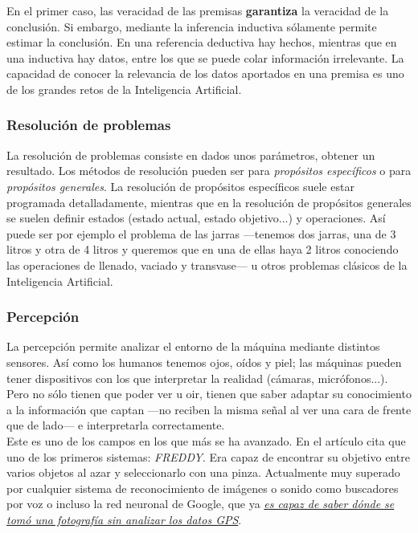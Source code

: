 \documentclass[a4paper]{article}
\begin{document}
    En el primer caso, las veracidad de las premisas \textbf{garantiza} la veracidad de la conclusión. Si embargo, mediante la inferencia inductiva sólamente permite estimar la conclusión. En una referencia deductiva hay hechos, mientras que en una inductiva hay datos, entre los que se puede colar información irrelevante. La capacidad de conocer la relevancia de los datos aportados en una premisa es uno de los grandes retos de la Inteligencia Artificial.

    \subsubsection*{Resolución de problemas}

    La resolución de problemas consiste en dados unos parámetros, obtener un resultado. Los métodos de resolución pueden ser para \emph{propósitos específicos} o para \emph{propósitos generales}. La resolución de propósitos específicos suele estar programada detalladamente, mientras que en la resolución de propósitos generales se suelen definir estados (estado actual, estado objetivo...) y operaciones. Así puede ser por ejemplo el problema de las jarras ---tenemos dos jarras, una de 3 litros y otra de 4 litros y queremos que en una de ellas haya 2 litros conociendo las operaciones de llenado, vaciado y transvase--- u otros problemas clásicos de la Inteligencia Artificial.

    \subsubsection*{Percepción}

    La percepción permite analizar el entorno de la máquina mediante distintos sensores. Así como los humanos tenemos ojos, oídos y piel; las máquinas pueden tener dispositivos con los que interpretar la realidad (cámaras, micrófonos...). Pero no sólo tienen que poder ver u oir, tienen que saber adaptar su conocimiento a la información que captan ---no reciben la misma señal al ver una cara de frente que de lado--- e interpretarla correctamente.\\

    Este es uno de los campos en los que más se ha avanzado. En el artículo cita que uno de los primeros sistemas: \emph{FREDDY}. Era capaz de encontrar su objetivo entre varios objetos al azar y seleccionarlo con una pinza. Actualmente muy superado por cualquier sistema de reconocimiento de imágenes o sonido como buscadores por voz o incluso la red neuronal de Google, que ya \href{http://www.microsiervos.com/archivo/tecnologia/red-neuronal-google-saber-donde-tomo-foto-mirarla-sin-datos-gps.html}{\textit{es capaz de saber dónde se tomó una fotografía sin analizar los datos GPS}}\cite{GNEUROIA}.
\end{document}

